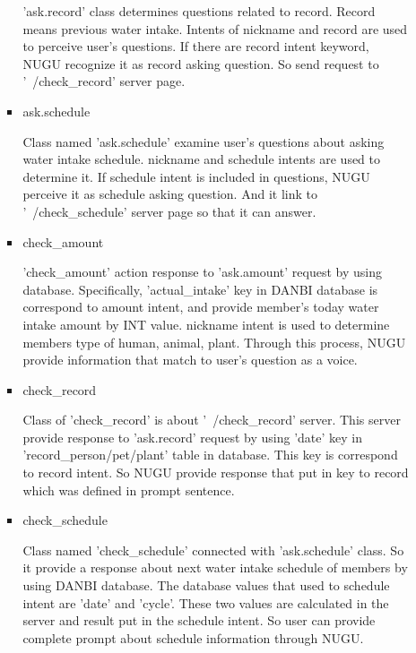 \documentclass[conference]{IEEEtran}
\begin{document}
\begin{itemize}
\begin{enumerate}
\begin{itemize}
            'ask.record' class determines questions related to record. Record means previous water intake. Intents of {{nickname}} and {{record}} are used to perceive user's questions. If there are {{record}} intent keyword, NUGU recognize it as record asking question. So send request to '~/check\_record' server page.
            \item ask.schedule 
            \setlength{\parindent}{2ex}
            
            Class named 'ask.schedule' examine user's questions about asking water intake schedule. {{nickname}} and {{schedule}} intents are used to determine it. If {{schedule}} intent is included in questions, NUGU perceive it as schedule asking question. And it link to '~/check\_schedule' server page so that it can answer.
            \item check\_amount 
            \setlength{\parindent}{2ex}
            
            'check\_amount' action response to 'ask.amount' request by using database. Specifically, 'actual\_intake' key in DANBI database is correspond to {{amount}} intent, and provide member's today water intake amount by INT value. {{nickname}} intent is used to determine members type of human, animal, plant. Through this process, NUGU provide information that match to user's question as a voice.
            \item check\_record 
            \setlength{\parindent}{2ex}
            
            Class of 'check\_record' is about '~/check\_record' server. This server provide response to 'ask.record' request by using 'date' key in 'record\_person/pet/plant' table in database. This key is correspond to {{record}} intent. So NUGU provide response that put in key to {{record}} which was defined in prompt sentence.
            \item check\_schedule 
            \setlength{\parindent}{2ex}
            
            Class named 'check\_schedule' connected with 'ask.schedule' class. So it provide a response about next water intake schedule of members by using DANBI database. The database values that used to {{schedule}} intent are 'date' and 'cycle'. These two values are calculated in the server and result put in the {{schedule}} intent. So user can provide complete prompt about schedule information through NUGU.
            
        \end{itemize}
        

\end{enumerate}
\end{itemize}
\end{document}

